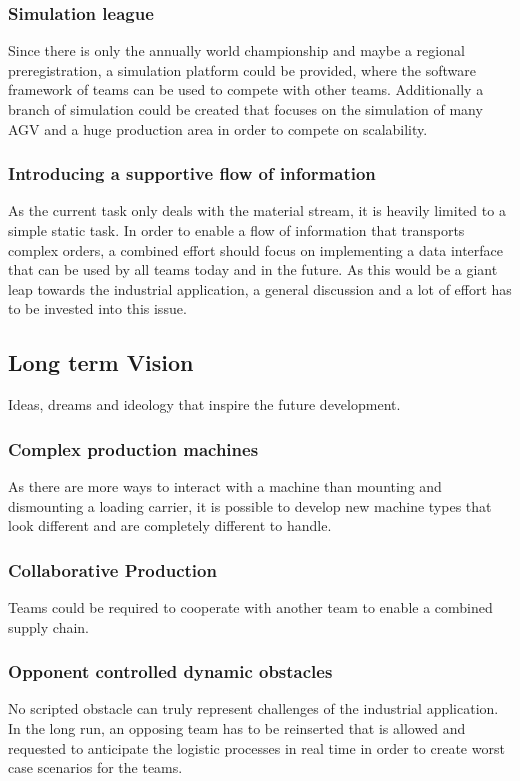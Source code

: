 \documentclass[12pt,twoside]{article}
\begin{document}
\subsubsection{Simulation league}

Since there is only the annually world championship and maybe a
regional preregistration, a simulation platform could be provided,
where the software framework of teams can be used to compete with
other teams. Additionally a branch of simulation could be created that
focuses on the simulation of many AGV and a huge production area in
order to compete on scalability.

\subsubsection{Introducing a supportive flow of information}
\label{sec:supp-flow}

As the current task only deals with the material stream, it is heavily
limited to a simple static task. In order to enable a flow of
information that transports complex orders, a combined effort should
focus on implementing a data interface that can be used by all teams
today and in the future. As this would be a giant leap towards the
industrial application, a general discussion and a lot of effort has
to be invested into this issue.


\subsection{Long term Vision}
Ideas, dreams and ideology that inspire the future development.

\subsubsection{Complex production machines}
As there are more ways to interact with a machine than mounting and
dismounting a loading carrier, it is possible to develop new machine
types that look different and are completely different to handle.

\subsubsection{Collaborative Production}
Teams could be required to cooperate with another team to enable a
combined supply chain. 

\subsubsection{Opponent controlled dynamic obstacles}
No scripted obstacle can truly represent challenges of the industrial
application. In the long run, an opposing team has to be reinserted
that is allowed and requested to anticipate the logistic processes in
real time in order to create worst case scenarios for the teams.
\end{document}
